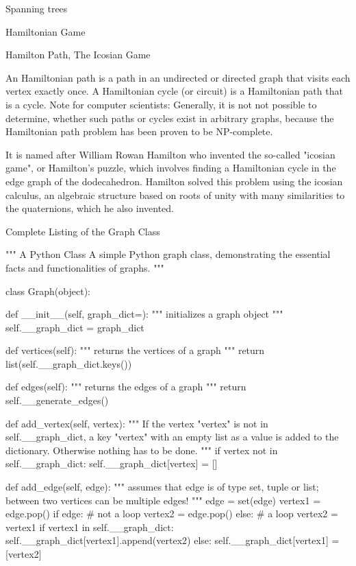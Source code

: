 Spanning trees 



Hamiltonian Game

Hamilton Path, The Icosian Game

An Hamiltonian path is a path in an undirected or directed graph that visits each vertex exactly once. A Hamiltonian cycle (or circuit) is a Hamiltonian path that is a cycle. 
Note for computer scientists: Generally, it is not not possible to determine, whether such paths or cycles exist in arbitrary graphs, because the Hamiltonian path problem has been proven to be NP-complete. 

It is named after William Rowan Hamilton who invented the so-called "icosian game", or Hamilton's puzzle, which involves finding a Hamiltonian cycle in the edge graph of the dodecahedron. Hamilton solved this problem using the icosian calculus, an algebraic structure based on roots of unity with many similarities to the quaternions, which he also invented. 



Complete Listing of the Graph Class

""" A Python Class
A simple Python graph class, demonstrating the essential 
facts and functionalities of graphs.
"""

class Graph(object):

    def __init__(self, graph_dict={}):
        """ initializes a graph object """
        self.__graph_dict = graph_dict

    def vertices(self):
        """ returns the vertices of a graph """
        return list(self.__graph_dict.keys())

    def edges(self):
        """ returns the edges of a graph """
        return self.__generate_edges()

    def add_vertex(self, vertex):
        """ If the vertex "vertex" is not in 
            self.__graph_dict, a key "vertex" with an empty
            list as a value is added to the dictionary. 
            Otherwise nothing has to be done. 
        """
        if vertex not in self.__graph_dict:
            self.__graph_dict[vertex] = []

    def add_edge(self, edge):
        """ assumes that edge is of type set, tuple or list; 
            between two vertices can be multiple edges! 
        """
        edge = set(edge)
        vertex1 = edge.pop()
        if edge:
            # not a loop
            vertex2 = edge.pop()
        else:
            # a loop
            vertex2 = vertex1
        if vertex1 in self.__graph_dict:
            self.__graph_dict[vertex1].append(vertex2)
        else:
            self.__graph_dict[vertex1] = [vertex2]

